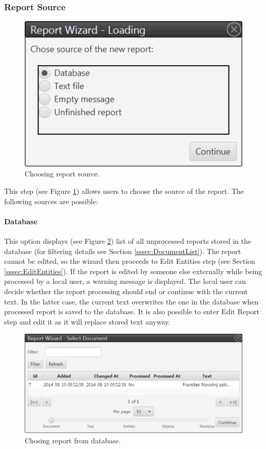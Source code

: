 \subsubsection{Report Source}
\label{sssec:ReportSource}

\begin{figure}[!htb]
        \centering
        \includegraphics{Images/source}
        \caption{Choosing report source.}
        \label{fig:Source}
\end{figure}

This step (see Figure \ref{fig:Source}) allows users to choose the source of the
report. The following sources are possible:

\paragraph{Database} This option displays (see Figure \ref{fig:Database}) list
of all unprocessed reports stored in the database (for filtering details see
Section \ref{sssec:DocumentList}).
The report cannot be edited, so the wizard then proceeds to Edit Entities step
(see Section \ref{sssec:EditEntities}).  If the report is edited by someone else
externally while being processed by a local user, a warning message is
displayed. The local user can decide whether the report processing should end or
continue with the current text. In the latter case, the current text overwrites
the one in the database when processed report is saved to the database. It is
also possible to enter Edit Report step and edit it as it will replace stored
text anyway.

\begin{figure}[!htb]
        \centering
        \includegraphics[width=\textwidth]{Images/database}
        \caption{Chosing report from database.}
        \label{fig:Database}
\end{figure}

